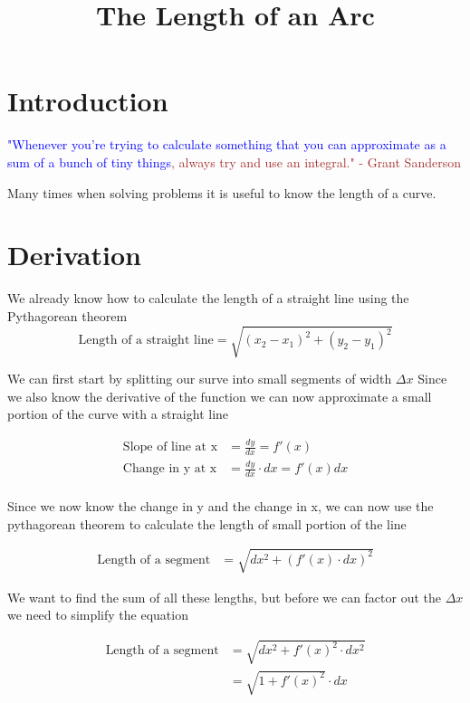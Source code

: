 \documentclass[12pt, letterpaper]{article}
\title{The Length of an Arc}
\begin{document}
\maketitle



\hrulefill

\section{Introduction}
\textcolor{blue}{"Whenever you're trying to calculate something that you can approximate as a sum of a bunch of tiny things}\textcolor{brown}{, 
always try and use an integral." - Grant Sanderson}

Many times when solving problems it is useful to know the length of a curve. 

\section{Derivation}

We already know how to calculate the length of a straight line using the Pythagorean theorem
\begin{equation}
    \text{Length of a straight line} = \sqrt{(x_2 - x_1)^2 + (y_2 - y_1)^2}
\end{equation}



We can first start by splitting our surve into small segments of width $\Delta x$
Since we also know the derivative of the function we can now approximate a small portion of the curve with a straight line

\begin{align}
    \text{Slope of line at x} &= \frac{dy}{dx} = f'(x) \\
    \text{Change in y at x} &= \frac{dy}{dx} \cdot dx = f'(x) dx \\
\end{align}

Since we now know the change in y and the change in x, we can now use the pythagorean theorem to calculate the length of small portion of the line

\begin{align}
    \text{Length of a segment} &= \sqrt{dx^2 + (f'(x) \cdot dx)^2} 
\end{align}

We want to find the sum of all these lengths, but before we can factor out the $\Delta x$ we need to simplify the equation

\begin{align}
    \text{Length of a segment} &= \sqrt{dx^2 + f'(x)^2 \cdot dx^2} \\
    &= \sqrt{1 + f'(x)^2} \cdot dx
\end{align}
\end{document}
